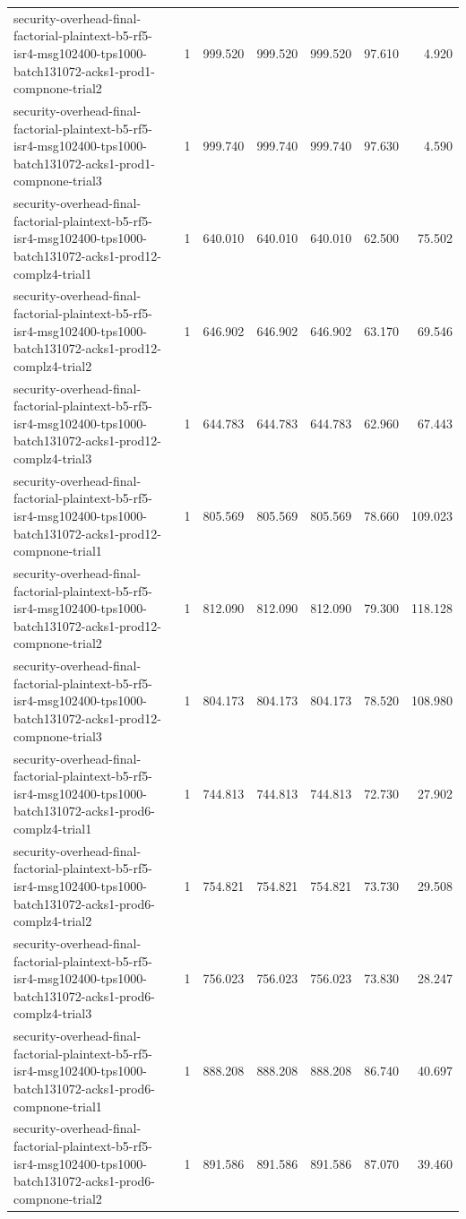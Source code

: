 \begin{tabular}{lrrrrrr}
security-overhead-final-factorial-plaintext-b5-rf5-isr4-msg102400-tps1000-batch131072-acks1-prod1-compnone-trial2 & 1 & 999.520 & 999.520 & 999.520 & 97.610 & 4.920 \\
security-overhead-final-factorial-plaintext-b5-rf5-isr4-msg102400-tps1000-batch131072-acks1-prod1-compnone-trial3 & 1 & 999.740 & 999.740 & 999.740 & 97.630 & 4.590 \\
security-overhead-final-factorial-plaintext-b5-rf5-isr4-msg102400-tps1000-batch131072-acks1-prod12-complz4-trial1 & 1 & 640.010 & 640.010 & 640.010 & 62.500 & 75.502 \\
security-overhead-final-factorial-plaintext-b5-rf5-isr4-msg102400-tps1000-batch131072-acks1-prod12-complz4-trial2 & 1 & 646.902 & 646.902 & 646.902 & 63.170 & 69.546 \\
security-overhead-final-factorial-plaintext-b5-rf5-isr4-msg102400-tps1000-batch131072-acks1-prod12-complz4-trial3 & 1 & 644.783 & 644.783 & 644.783 & 62.960 & 67.443 \\
security-overhead-final-factorial-plaintext-b5-rf5-isr4-msg102400-tps1000-batch131072-acks1-prod12-compnone-trial1 & 1 & 805.569 & 805.569 & 805.569 & 78.660 & 109.023 \\
security-overhead-final-factorial-plaintext-b5-rf5-isr4-msg102400-tps1000-batch131072-acks1-prod12-compnone-trial2 & 1 & 812.090 & 812.090 & 812.090 & 79.300 & 118.128 \\
security-overhead-final-factorial-plaintext-b5-rf5-isr4-msg102400-tps1000-batch131072-acks1-prod12-compnone-trial3 & 1 & 804.173 & 804.173 & 804.173 & 78.520 & 108.980 \\
security-overhead-final-factorial-plaintext-b5-rf5-isr4-msg102400-tps1000-batch131072-acks1-prod6-complz4-trial1 & 1 & 744.813 & 744.813 & 744.813 & 72.730 & 27.902 \\
security-overhead-final-factorial-plaintext-b5-rf5-isr4-msg102400-tps1000-batch131072-acks1-prod6-complz4-trial2 & 1 & 754.821 & 754.821 & 754.821 & 73.730 & 29.508 \\
security-overhead-final-factorial-plaintext-b5-rf5-isr4-msg102400-tps1000-batch131072-acks1-prod6-complz4-trial3 & 1 & 756.023 & 756.023 & 756.023 & 73.830 & 28.247 \\
security-overhead-final-factorial-plaintext-b5-rf5-isr4-msg102400-tps1000-batch131072-acks1-prod6-compnone-trial1 & 1 & 888.208 & 888.208 & 888.208 & 86.740 & 40.697 \\
security-overhead-final-factorial-plaintext-b5-rf5-isr4-msg102400-tps1000-batch131072-acks1-prod6-compnone-trial2 & 1 & 891.586 & 891.586 & 891.586 & 87.070 & 39.460 \\

\end{tabular}
